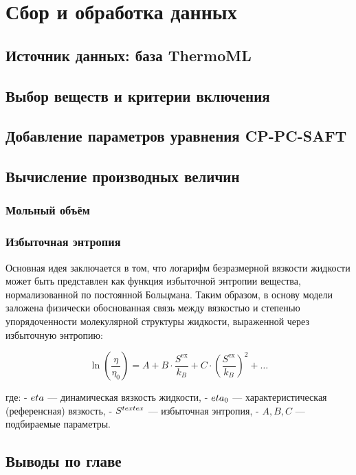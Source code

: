 \documentclass[a4paper,12pt]{article}
\begin{document}
\section{Сбор и обработка данных}
  \subsection{Источник данных: база ThermoML}
  \subsection{Выбор веществ и критерии включения}
  \subsection{Добавление параметров уравнения CP-PC-SAFT}
  \subsection{Вычисление производных величин}
    \subsubsection{Мольный объём}
    \subsubsection{Избыточная энтропия}

Основная идея заключается в том, что логарифм безразмерной вязкости жидкости может быть представлен как функция избыточной энтропии вещества, нормализованной по постоянной Больцмана. Таким образом, в основу модели заложена физически обоснованная связь между вязкостью и степенью упорядоченности молекулярной структуры жидкости, выраженной через избыточную энтропию:

\[
\ln \left( \frac{\eta}{\eta_0} \right) = A + B \cdot \frac{S^{\text{ex}}}{k_B} + C \cdot \left(\frac{S^{\text{ex}}}{k_B} \right)^2 + \ldots
\]

где:
- \( \\eta \) — динамическая вязкость жидкости,
- \( \\eta_0 \) — характеристическая (референсная) вязкость,
- \( S^{\\text{ex}} \) — избыточная энтропия,
- \( A, B, C \) — подбираемые параметры.


  \subsection{Выводы по главе}
\newpage
\end{document}
